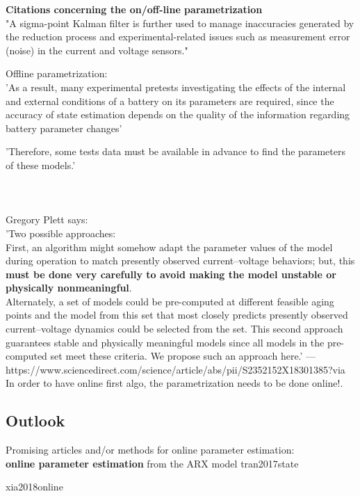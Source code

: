 \textbf{Citations concerning the on/off-line parametrization} \\

"A sigma-point Kalman filter is further used to manage inaccuracies generated by the reduction process and experimental-related issues such as measurement error (noise) in the current and voltage sensors."


Offline parametrization: \\
'As a result, many experimental pretests investigating the
effects of the internal and external conditions of a battery on its parameters are required, since the
accuracy of state estimation depends on the quality of the information regarding battery parameter
changes'

'Therefore, some tests data must be available in 
advance to find the parameters of these models.'
\cite{hussein2011overview}  \\ \\ \\ \\

Gregory Plett says: \\
'Two possible approaches: \\

First, an algorithm might somehow adapt the parameter values of the model during operation to match presently observed current–voltage behaviors; but, this \textbf{must be done very carefully to avoid making the model unstable or physically nonmeaningful}. \\

Alternately, a set of models could be pre-computed at different feasible aging points and the model from this set that most closely predicts presently observed current–voltage dynamics could be selected from the set. This second approach guarantees stable and physically meaningful models since all models in the pre-computed set meet these criteria. We propose such an approach here.' 
---https://www.sciencedirect.com/science/article/abs/pii/S2352152X18301385?via%
In order to have online first algo, the parametrization needs to be done online!. 



\subsection{Outlook} 

Promising articles and/or methods for online parameter estimation: \\ 

\textbf{online parameter estimation} from the ARX model {tran2017state}

\cite{wang2021augmented}
{xia2018online}
